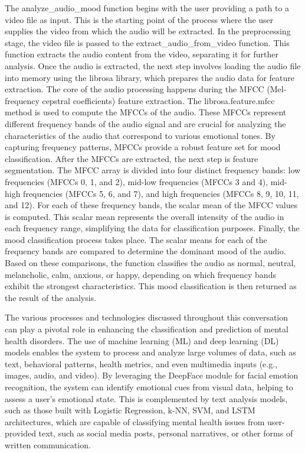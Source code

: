 \noindent
The analyze\_audio\_mood function begins with the user providing a path to a video file as input. This is the starting point of the process where the user supplies the video from which the audio will be extracted. In the preprocessing stage, the video file is passed to the extract\_audio\_from\_video function. This function extracts the audio content from the video, separating it for further analysis. Once the audio is extracted, the next step involves loading the audio file into memory using the librosa library, which prepares the audio data for feature extraction. The core of the audio processing happens during the MFCC (Mel-frequency cepstral coefficients) feature extraction. The librosa.feature.mfcc method is used to compute the MFCCs of the audio. These MFCCs represent different frequency bands of the audio signal and are crucial for analyzing the characteristics of the audio that correspond to various emotional tones. By capturing frequency patterns, MFCCs provide a robust feature set for mood classification. After the MFCCs are extracted, the next step is feature segmentation. The MFCC array is divided into four distinct frequency bands: low frequencies (MFCCs 0, 1, and 2), mid-low frequencies (MFCCs 3 and 4), mid-high frequencies (MFCCs 5, 6, and 7), and high frequencies (MFCCs 8, 9, 10, 11, and 12). For each of these frequency bands, the scalar mean of the MFCC values is computed. This scalar mean represents the overall intensity of the audio in each frequency range, simplifying the data for classification purposes. Finally, the mood classification process takes place. The scalar means for each of the frequency bands are compared to determine the dominant mood of the audio. Based on these comparisons, the function classifies the audio as normal, neutral, melancholic, calm, anxious, or happy, depending on which frequency bands exhibit the strongest characteristics. This mood classification is then returned as the result of the analysis.



\vspace{2em}

\noindent
The various processes and technologies discussed throughout this conversation can play a pivotal role in enhancing the classification and prediction of mental health disorders. The use of machine learning (ML) and deep learning (DL) models enables the system to process and analyze large volumes of data, such as text, behavioral patterns, health metrics, and even multimedia inputs (e.g., images, audio, and video). By leveraging the DeepFace module for facial emotion recognition, the system can identify emotional cues from visual data, helping to assess a user’s emotional state. This is complemented by text analysis models, such as those built with Logistic Regression, k-NN, SVM, and LSTM architectures, which are capable of classifying mental health issues from user-provided text, such as social media posts, personal narratives, or other forms of written communication.

